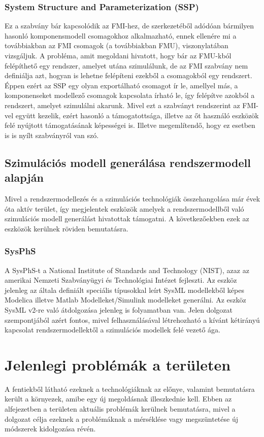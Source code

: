        \subsubsection{System Structure and Parameterization (SSP)} \label{sec:ssp}
        Ez a szabvány bár kapcsolódik az FMI-hez, de szerkezetéből adódóan bármilyen hasonló
        komponensmodell csomagokhoz alkalmazható, ennek ellenére mi a továbbiakban az FMI csomagok (a
        továbbiakban FMU), viszonylatában vizsgáljuk. A probléma, amit megoldani hivatott, hogy bár az
        FMU-kból felépíthető egy rendszer, amelyet utána szimulálunk, de az FMI szabvány nem definiálja
        azt, hogyan is lehetne felépíteni ezekből a csomagokból egy rendszert. Éppen ezért az SSP egy olyan
        exportálható csomagot ír le, amellyel más, a komponenseket modellező csomagok kapcsolata írható le,
        így felépítve azokból a rendszert, amelyet szimulálni akarunk. Mivel ezt a szabványt rendszerint az
        FMI-vel együtt kezelik, ezért hasonló a támogatottsága, illetve az őt használó eszközök felé nyújtott
        támogatásának képességei is. Illetve megemlítendő, hogy ez esetben is is nyílt szabványról van szó.

    \subsection{Szimulációs modell generálása rendszermodell alapján}
    Mivel a rendszermodellezés és a szimulációs technológiák összehangolása már évek óta aktív terület, így megjelentek eszközök amelyek a rendszermodellből való szimulációs modell generálást hivatottak támogatni. A következőekben ezek az eszközök kerülnek röviden bemutatásra.

        \subsubsection{SysPhS} \label{sec:SysPhS}
        A SysPhS-t a National Institute of Standards and Technology (NIST), azaz az amerikai Nemzeti Szabványügyi és Technológiai Intézet fejleszti. Az eszköz jelenleg az általa definiált speciális típusokkal leírt SysML modellekből képes Modelica illetve Matlab Modelleket/Simulink modelleket generálni.
        Az eszköz SysML v2-re való átdolgozása jelenleg is folyamatban van. Jelen dolgozat szempontjából azért fontos, mivel felhasználásával létrehozható a kívánt kétirányú kapcsolat rendszermodellektől a szimulációs modellek felé vezető ága.


\section{Jelenlegi problémák a területen}
A fentiekből látható ezeknek a technológiáknak az előnye, valamint bemutatásra került a környezek, amibe egy új megoldásnak illeszkednie kell.
Ebben az alfejezetben a területen aktuális problémák kerülnek bemutatásra, mivel a dolgozat célja ezeknek a problémáknak a mérséklése vagy megszüntetése új módszerek kidolgozása révén.

